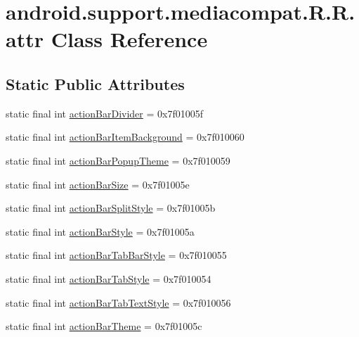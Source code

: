 \hypertarget{classandroid_1_1support_1_1mediacompat_1_1_r_1_1attr}{
\section{android.support.mediacompat.R.R.attr Class Reference}
\label{classandroid_1_1support_1_1mediacompat_1_1_r_1_1attr}
}
\subsection*{Static Public Attributes}
\begin{CompactItemize}
\item 
static final int \hyperlink{classandroid_1_1support_1_1mediacompat_1_1_r_1_1attr_f195337b8a844f715f0d4e8d4ef84602}{actionBarDivider} = 0x7f01005f
\item 
static final int \hyperlink{classandroid_1_1support_1_1mediacompat_1_1_r_1_1attr_42ac513b5553f89cf9ca3157c4a155ab}{actionBarItemBackground} = 0x7f010060
\item 
static final int \hyperlink{classandroid_1_1support_1_1mediacompat_1_1_r_1_1attr_f52c50a497dfc513c61c785996dae864}{actionBarPopupTheme} = 0x7f010059
\item 
static final int \hyperlink{classandroid_1_1support_1_1mediacompat_1_1_r_1_1attr_54e10d224a62341c8d60248128800347}{actionBarSize} = 0x7f01005e
\item 
static final int \hyperlink{classandroid_1_1support_1_1mediacompat_1_1_r_1_1attr_f3e7e65f8d3a24de174ab5cf8d2841f0}{actionBarSplitStyle} = 0x7f01005b
\item 
static final int \hyperlink{classandroid_1_1support_1_1mediacompat_1_1_r_1_1attr_cdc7db14a4990f775e8c8b4f3c4e0c08}{actionBarStyle} = 0x7f01005a
\item 
static final int \hyperlink{classandroid_1_1support_1_1mediacompat_1_1_r_1_1attr_3a1fef9c5ce679cbd0df22480901b7f2}{actionBarTabBarStyle} = 0x7f010055
\item 
static final int \hyperlink{classandroid_1_1support_1_1mediacompat_1_1_r_1_1attr_1d915678d85232f9287c18772ec2ea3b}{actionBarTabStyle} = 0x7f010054
\item 
static final int \hyperlink{classandroid_1_1support_1_1mediacompat_1_1_r_1_1attr_e0211a6f0bc4feead58bdbd66a36c853}{actionBarTabTextStyle} = 0x7f010056
\item 
static final int \hyperlink{classandroid_1_1support_1_1mediacompat_1_1_r_1_1attr_8ea66b10eeb9aaae8eddeca4831e9d29}{actionBarTheme} = 0x7f01005c

\end{CompactItemize}
